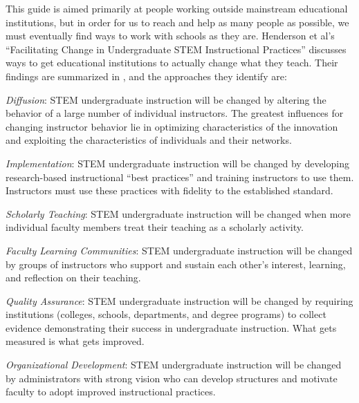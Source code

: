 
This guide is aimed primarily at people working outside mainstream
educational institutions, but in order for us to reach and help as
many people as possible, we must eventually find ways to work with
schools as they are.  Henderson et al's ``Facilitating Change in
Undergraduate STEM Instructional Practices''
\cite{bib:henderson-facilitating} discusses ways to get educational
institutions to actually change what they teach.  Their findings are
summarized in , and the approaches they identify
are:

\begin{gitemize}

\item
  \emph{Diffusion}: STEM undergraduate instruction will be changed by
  altering the behavior of a large number of individual
  instructors. The greatest influences for changing instructor
  behavior lie in optimizing characteristics of the innovation and
  exploiting the characteristics of individuals and their networks.

\item
  \emph{Implementation}: STEM undergraduate instruction will be
  changed by developing research-based instructional ``best
  practices'' and training instructors to use them. Instructors must
  use these practices with fidelity to the established standard.

\item
  \emph{Scholarly Teaching}: STEM undergraduate instruction will be
  changed when more individual faculty members treat their teaching as
  a scholarly activity.

\item
  \emph{Faculty Learning Communities}: STEM undergraduate instruction
  will be changed by groups of instructors who support and sustain
  each other's interest, learning, and reflection on their teaching.

\item
  \emph{Quality Assurance}: STEM undergraduate instruction will be
  changed by requiring institutions (colleges, schools, departments,
  and degree programs) to collect evidence demonstrating their success
  in undergraduate instruction. What gets measured is what gets
  improved.

\item
  \emph{Organizational Development}: STEM undergraduate instruction
  will be changed by administrators with strong vision who can develop
  structures and motivate faculty to adopt improved instructional
  practices.


\end{gitemize}

